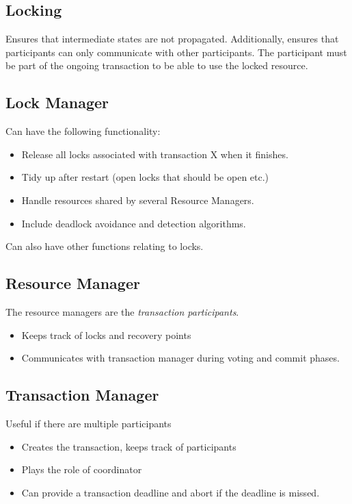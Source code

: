 \subsection{Locking}
Ensures that intermediate states are not propagated. Additionally, ensures that participants can only communicate with other participants. The participant must be part of the ongoing transaction to be able to use the locked resource. 

\subsection{Lock Manager}
Can have the following functionality:
\begin{itemize}
\item Release all locks associated with transaction X when it finishes.
\item Tidy up after restart (open locks that should be open etc.)
\item Handle resources shared by several Resource Managers.
\item Include deadlock avoidance and detection algorithms.
\end{itemize}
Can also have other functions relating to locks.

\subsection{Resource Manager}
The resource managers are the \textit{transaction participants}. 
\begin{itemize}
\item Keeps track of locks and recovery points
\item Communicates with transaction manager during voting and commit phases.
\end{itemize}

\subsection{Transaction Manager}
Useful if there are multiple participants
\begin{itemize}
\item Creates the transaction, keeps track of participants
\item Plays the role of coordinator
\item Can provide a transaction deadline and abort if the deadline is missed.
\end{itemize}


